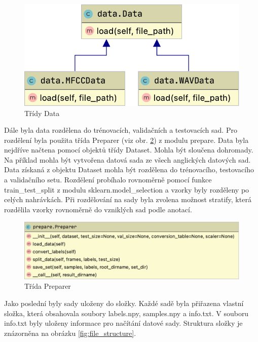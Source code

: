 \documentclass[FM,BP]{tulthesis}
\newcommand{\note}[1]{\todo[color=blue!40]{#1}}
\begin{document}
\begin{figure}[ht]
\centerline{\includegraphics[scale=.25,keepaspectratio]{data-data.png}}
\caption{Třídy Data}
\label{fig:data}
\end{figure}
\FloatBarrier

Dále byla data rozdělena do trénovacích, validačních a testovacích sad. Pro rozdělení byla použita třída Preparer (viz obr. \ref{fig:preparer}) z modulu prepare. Data byla nejdříve načtena pomocí objektů třídy Dataset. Mohla být sloučena dohromady. Na příklad mohla být vytvořena datová sada ze všech anglických datových sad. \note{asi lépe vysvětlit}
Data získaná z objektu Dataset mohla být rozdělena do trénovacího, testovacího a validačního setu. Rozdělení probíhalo rovnoměrně pomocí funkce train\_test\_split z modulu sklearn.model\_selection a vzorky byly rozděleny po celých nahrávkách. Při rozdělování na sady byla zvolena možnost stratify, která rozdělila vzorky rovnoměrně do vzniklých sad podle anotací.

\begin{figure}[ht]
\centerline{\includegraphics[scale=.25,keepaspectratio]{prepare.png}}
\caption{Třída Preparer}
\label{fig:preparer}
\end{figure}
\FloatBarrier

Jako poslední byly sady uloženy do složky. Každé sadě byla přiřazena vlastní složka, která obsahovala soubory labels.npy, samples.npy a info.txt. V souboru info.txt byly uloženy informace pro načítání datové sady. Struktura složky je znázorněna na obrázku \mbox{\ref{fig:file_structure}}. 
\end{document}
